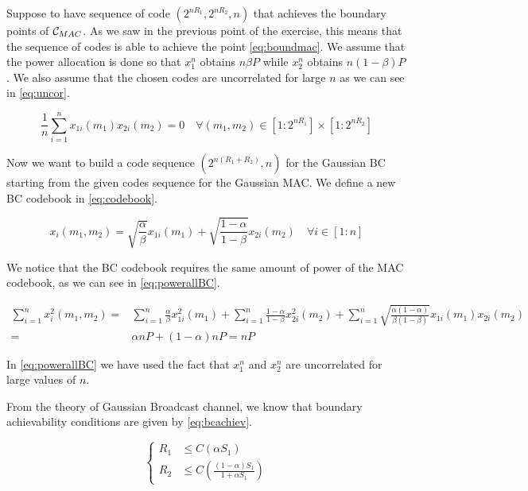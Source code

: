 Suppose to have sequence of code $(2^{nR_1}, 2^{nR_2}, n)$ that achieves the boundary points of $\mathcal{C}_{MAC}$. As we saw in the previous point of the exercise, this means that the sequence of codes is able to achieve the point \eqref{eq:boundmac}. We assume that the power allocation is done so that $x_1^n$ obtains $n \beta P$ while $x_2^n$ obtains $n (1-\beta) P$. We also assume that the chosen codes are uncorrelated for large $n$ as we can see in \eqref{eq:uncor}.

\begin{equation}
	\frac{1}{n}\sum_{i=1}^n x_{1i}(m_1) x_{2i} (m_2)= 0 \quad \forall (m_1,m_2) \in [1:2^{nR_1}]\times[1:2^{nR_2}]
	\label{eq:uncor}
\end{equation}

Now we want to build a code sequence $(2^{n(R_1+R_2)},n)$ for the Gaussian BC starting from the given codes sequence for the Gaussian MAC. We define a new BC codebook in \eqref{eq:codebook}.

\begin{equation}
	x_i(m_1,m_2)= \sqrt{\frac{\alpha}{\beta}}x_{1i}(m_1)+\sqrt{\frac{1-\alpha}{1-\beta}}x_{2i}(m_2) \quad \forall i \in [1:n]
	\label{eq:codebook}
\end{equation}

We notice that the BC codebook requires the same amount of power of the MAC codebook, as we can see in \eqref{eq:powerallBC}.

\begin{equation}
	\begin{aligned}
		\sum_{i=1}^n x_i^2(m_1,m_2) = & \sum_{i=1}^n \frac{\alpha}{\beta} x_{1i}^2(m_1) + \sum_{i=1}^n \frac{1-\alpha}{1-\beta} x_{2i}^2(m_2) + \sum_{i=1}^n \sqrt{\frac{\alpha(1-\alpha)}{\beta(1-\beta)}} x_{1i}(m_1) x_{2i}(m_2)\\
		= & \alpha nP + (1-\alpha) nP = nP
	\end{aligned}
	\label{eq:powerallBC}
\end{equation}

In \eqref{eq:powerallBC} we have used the fact that $x_1^n$ and $x_2^n$ are uncorrelated for large values of $n$.

From the theory of Gaussian Broadcast channel, we know that boundary achievability conditions are given by \eqref{eq:bcachiev}.

\begin{equation}
\begin{cases}
	R_1 &\leq C(\alpha S_1) \\
	R_2  &\leq C \left( \frac{(1-\alpha )S_1} {1+\alpha S_1} \right)
\end{cases}
\label{eq:bcachiev}
\end{equation}


